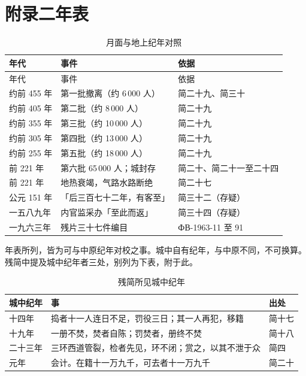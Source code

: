 \vspace{3mm}

\chapter*{附录二\quad 年表}
{}
\begingroup
\footnotesize
\linespread{1.2}\selectfont
\begin{longtable}{@{}p{30mm}p{72mm}p{32mm}@{}}
\caption{月面与地上纪年对照}\\
\toprule
年代 & 事件 & 依据\\
\midrule
\endfirsthead
\toprule
年代 & 事件 & 依据\\
\midrule
\endhead
约前 455 年 & 第一批撤离（约 6\,000 人） & 简二十九、简三十\\
约前 405 年 & 第二批（约 8\,000 人） & 简二十九\\
约前 355 年 & 第三批（约 10\,000 人） & 简二十九\\
约前 305 年 & 第四批（约 13\,000 人） & 简二十九\\
约前 255 年 & 第五批（约 18\,000 人） & 简二十九\\
前 221 年 & 第六批 65\,000 人；城封存 & 简二十、简二十一至二十四\\
前 221 年 & 地热衰竭，气路水路断绝 & 简二十七\\
公元 151 年 & 「后三百七十二年，有客至」 & 简三十二（存疑）\\
一五八九年 & 内官监采办「至此而返」 & 简三十四（存疑）\\
一九六三年 & 残片三十七件编目 & ФВ-1963-11 至 91\\
\bottomrule
\end{longtable}
\endgroup

\vspace{6mm}
年表所列，皆为可与中原纪年对校之事。城中自有纪年，与中原不同，不可换算。残简中提及城中纪年者三处，别列为下表，附于此。

\vspace{3mm}
\begin{table}[htbp]
\centering
\small
\caption{残简所见城中纪年}
\begin{tabular}{@{}lll@{}}
\toprule
城中纪年 & 事 & 出处\\
\midrule
十四年 & 捣者十一人连日不足，罚役三日；其一人再犯，移籍 & 简十七\\
十九年 & 一册不焚，焚者自陈；罚焚者，册终不焚 & 简十八\\
二十三年 & 三环西道管裂，检者先见，环不闭；赏之，以其不泄于众 & 简四\\
\midrule
元年 & 会计。在籍十一万九千，可去者十一万九千 & 简二十\\
\bottomrule
\end{tabular}
\end{table}

